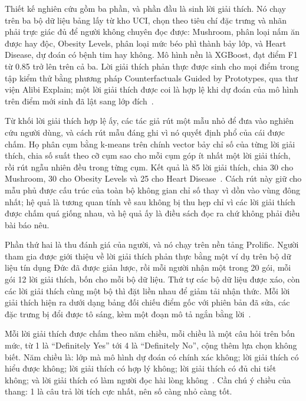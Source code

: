 %
Thiết kế nghiên cứu gồm ba phần, và phần đầu là sinh lời giải thích. Nó chạy
trên ba bộ dữ liệu bảng lấy từ kho UCI, chọn theo tiêu chí đặc
trưng và nhãn phải trực giác đủ để người không chuyên đọc được: Mushroom, phân
loại nấm ăn được hay độc, Obesity Levels, phân loại mức béo phì thành bảy lớp,
và Heart Disease, dự đoán có bệnh tim hay không. Mô hình nền là XGBoost, đạt
điểm F1 từ 0.85 trở lên trên cả ba. Lời giải thích phản thực được sinh cho mọi
điểm trong tập kiểm thử bằng phương pháp Counterfactuals Guided by Prototypes,
qua thư viện Alibi Explain; một lời giải thích được coi là hợp lệ khi dự đoán
của mô hình trên điểm mới sinh đã lật sang lớp
đích~\autocite{p25userperception}.

Từ khối lời giải thích hợp lệ ấy, các tác giả rút một mẫu nhỏ để đưa vào
nghiên cứu người dùng, và cách rút mẫu đáng ghi vì nó quyết định phổ của cái
được chấm. Họ phân cụm bằng k-means trên chính vector bảy chỉ số của từng lời
giải thích, chia số suất theo cỡ cụm sao cho mỗi cụm góp ít nhất một lời giải
thích, rồi rút ngẫu nhiên đều trong từng cụm. Kết quả là 85 lời giải thích,
chia 30 cho Mushroom, 30 cho Obesity Levels và 25 cho Heart
Disease~\autocite{p25userperception}. Cách rút này giữ cho mẫu phủ được cấu
trúc của toàn bộ không gian chỉ số thay vì dồn vào vùng đông nhất; hệ quả là
tương quan tính về sau không bị thu hẹp chỉ vì các lời giải thích được chấm
quá giống nhau, và hệ quả ấy là điều sách đọc ra chứ không phải điều bài báo
nêu.

%
Phần thứ hai là thu đánh giá của người, và nó chạy trên nền tảng Prolific. Người tham gia được giới thiệu
về lời giải thích phản thực bằng một ví dụ trên bộ dữ liệu tín dụng Đức đã
được giản lược, rồi mỗi người nhận một trong 20 gói, mỗi gói 12 lời giải
thích, bốn cho mỗi bộ dữ liệu. Thứ tự các bộ dữ liệu được xáo, còn các lời
giải thích cùng một bộ thì đặt liền nhau để giảm tải nhận thức. Mỗi lời giải
thích hiện ra dưới dạng bảng đối chiếu điểm gốc với phiên bản đã sửa, các đặc
trưng bị đổi được tô sáng, kèm một đoạn mô tả ngắn bằng
lời~\autocite{p25userperception}.

Mỗi lời giải thích được chấm theo năm chiều, mỗi chiều là một câu hỏi trên
 bốn mức, từ 1 là \enquote{Definitely Yes} tới
4 là \enquote{Definitely No}, cộng thêm lựa chọn không biết. Năm chiều là: lớp
mà mô hình dự đoán có chính xác không; lời giải thích có hiểu được không; lời
giải thích có hợp lý không; lời giải thích có đủ chi tiết không; và lời giải
thích có làm người đọc hài lòng không~\autocite{p25userperception}. Cần chú ý
chiều của thang: 1 là câu trả lời tích cực nhất, nên số càng nhỏ càng tốt.

